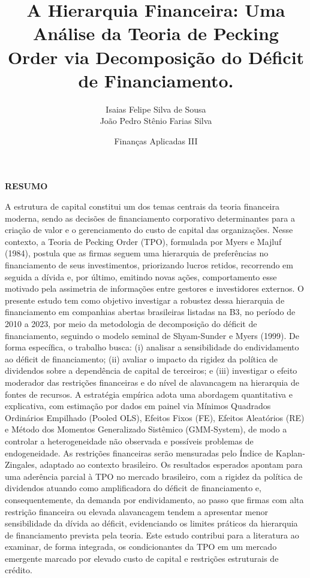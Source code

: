 \documentclass[a4paper,12pt]{article}
\title{\textbf{A Hierarquia Financeira:} Uma Análise da Teoria de Pecking Order via Decomposição do Déficit de Financiamento.}
\author{
    Isaias Felipe Silva de Sousa \\
    João Pedro Stênio Farias Silva
}
\date{Finanças Aplicadas III}
\begin{document}
\maketitle

\newpage
\begin{center}
    \textbf{RESUMO}
\end{center}
 
\noindent
A estrutura de capital constitui um dos temas centrais da teoria financeira moderna, sendo as decisões de financiamento corporativo determinantes para a criação de valor e o gerenciamento do custo de capital das organizações. Nesse contexto, a Teoria de Pecking Order (TPO), formulada por Myers e Majluf (1984), postula que as firmas seguem uma hierarquia de preferências no financiamento de seus investimentos, priorizando lucros retidos, recorrendo em seguida a dívida e, por último, emitindo novas ações, comportamento esse motivado pela assimetria de informações entre gestores e investidores externos. O presente estudo tem como objetivo investigar a robustez dessa hierarquia de financiamento em companhias abertas brasileiras listadas na B3, no período de 2010 a 2023, por meio da metodologia de decomposição do déficit de financiamento, seguindo o modelo seminal de Shyam-Sunder e Myers (1999). De forma específica, o trabalho busca: (i) analisar a sensibilidade do endividamento ao déficit de financiamento; (ii) avaliar o impacto da rigidez da política de dividendos sobre a dependência de capital de terceiros; e (iii) investigar o efeito moderador das restrições financeiras e do nível de alavancagem na hierarquia de fontes de recursos. A estratégia empírica adota uma abordagem quantitativa e explicativa, com estimação por dados em painel via Mínimos Quadrados Ordinários Empilhado (Pooled OLS), Efeitos Fixos (FE), Efeitos Aleatórios (RE) e Método dos Momentos Generalizado Sistêmico (GMM-System), de modo a controlar a heterogeneidade não observada e possíveis problemas de endogeneidade. As restrições financeiras serão mensuradas pelo Índice de Kaplan-Zingales, adaptado ao contexto brasileiro. Os resultados esperados apontam para uma aderência parcial à TPO no mercado brasileiro, com a rigidez da política de dividendos atuando como amplificadora do déficit de financiamento e, consequentemente, da demanda por endividamento, ao passo que firmas com alta restrição financeira ou elevada alavancagem tendem a apresentar menor sensibilidade da dívida ao déficit, evidenciando os limites práticos da hierarquia de financiamento prevista pela teoria. Este estudo contribui para a literatura ao examinar, de forma integrada, os condicionantes da TPO em um mercado emergente marcado por elevado custo de capital e restrições estruturais de crédito.
 
\end{document}
